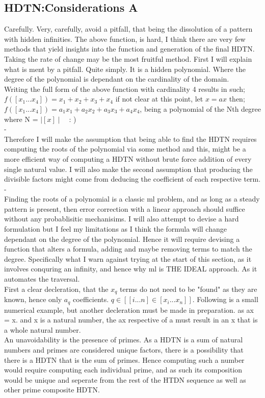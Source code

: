 \documentclass{article}
\begin{document}
\subsection{HDTN:Considerations A}
Carefully. Very, carefully, avoid a pitfall, that being the dissolution of a pattern with hidden infinities.
The above function, is hard, I think there are very few methods that yield insights into the function and generation
of the final HDTN. Taking the rate of change may be the most fruitful method. First I will explain what is ment by a pitfall.
Quite simply. It is a hidden polynomial. Where the degree of the polynomial is dependant on the cardinality of the domain.\\
Writing the full form of the above function with cardinality 4 results in such;\\
$f([x_1...x_4])=x_1+x_2+x_3+x_4$ if not clear at this point, let $x = ax$ then;\\
$f([x_1...x_4])=a_1x_1+a_2x_2+a_3x_3+a_4x_4$, being a polynomial of the Nth degree where N = $\mid[x]\mid$\ \ : )\\
{\color{white}-}\\
Therefore I will make the assumption that being able to find the HDTN requires computing the roots of the polynomial via some method
and this, might be a more efficient way of computing a HDTN without brute force addition of every single natural value. I will also
make the second assumption that producing the divisible factors might come from deducing the coefficient of each respective term.\\
{\color{white}-}\\
Finding the roots of a polynomial is a classic ml problem, and as long as a steady pattern is present, then error correction with
a linear approach should suffice without any probablisitic mechanisims. I will also attempt to devise a hard formulation but I feel
my limitations as I think the formula will change dependant on the degree of the polynomial. Hence it will require devising a
function that alters a formula, adding and maybe removing terms to match the degree. Specifically what I warn against trying at the 
start of this section, as it involves conquring an infinity, and hence why ml is THE IDEAL approach. As it automates the traversal.
\\
First a clear decleration, that the $x_q$ terms do not need to be "found" as they are known, hence only $a_q$ coefficients.
$q \in [[i...n]\in[x_i...x_n]]$. Following is a small numerical example, but another decleration must be made in preparation. as ax = x.
and x is a natural number, the ax respective of a must result in an x that is a whole natural number.\\
An unavoidability is the presence of primes. As a HDTN is a sum of natural numbers and primes are considered unique factors, 
there is a possibility that there is a HDTN that is the sum of primes. Hence computing such a number would require computing each
individual prime, and as such its composition would be unique and seperate from the rest of the HTDN sequence as well as other
prime composite HDTN.
\end{document}

